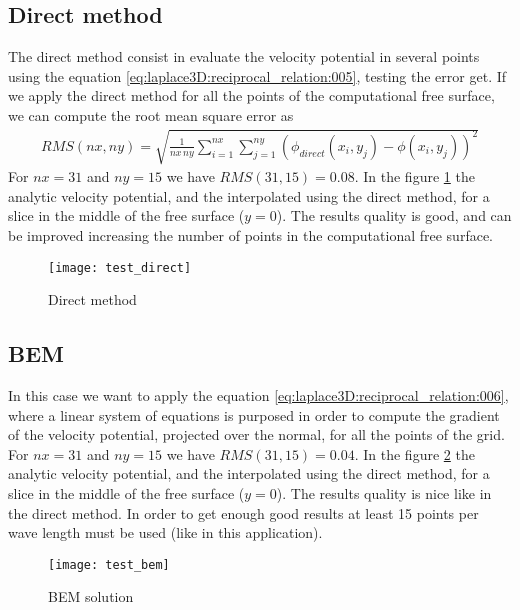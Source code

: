\subsection{Direct method}
\label{sss:laplace3D:test:direct}
%
The direct method consist in evaluate the velocity potential in several points
using the equation \ref{eq:laplace3D:reciprocal_relation:005}, testing the error
get.\rc
%
If we apply the direct method for all the points of the computational free surface,
we can compute the root mean square error as
%
\begin{eqnarray*}
	RMS(nx,ny) = \sqrt{\frac{1}{nx \, ny} \sum_{i=1}^{nx} \sum_{j=1}^{ny}
		\left( \phi_{direct}(x_i,y_j) - \phi(x_i,y_j) \right)^2
	}
\end{eqnarray*}
%
For $nx = 31$ and $ny = 15$ we have $RMS(31,15) = 0.08$. In the figure
\ref{fig:laplace3D:test:direct} the analytic velocity potential, and the
interpolated using the direct method, for a slice in the middle of the
free surface ($y=0$).\rc
%
The results quality is good, and can be improved increasing the number of
points in the computational free surface.
%
\begin{figure}[ht!]
  \centering
  \texttt{[image: test\_direct]}
  \caption{Direct method}
  \label{fig:laplace3D:test:direct}
\end{figure}
%
\subsection{BEM}
\label{sss:laplace3D:test:bem}
%
In this case we want to apply the equation \ref{eq:laplace3D:reciprocal_relation:006},
where a linear system of equations is purposed in order to compute the gradient of the
velocity potential, projected over the normal, for all the points of the grid.
%
For $nx = 31$ and $ny = 15$ we have $RMS(31,15) = 0.04$. In the figure
\ref{fig:laplace3D:test:bem} the analytic velocity potential, and the
interpolated using the direct method, for a slice in the middle of the
free surface ($y=0$).\rc
%
The results quality is nice like in the direct method. In order to get enough good
results at least 15 points per wave length must be used (like in this application).
%
\begin{figure}[ht!]
  \centering
  \texttt{[image: test\_bem]}
  \caption{BEM solution}
  \label{fig:laplace3D:test:bem}
\end{figure}
%